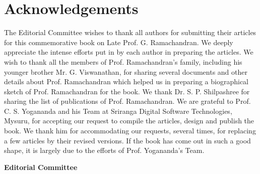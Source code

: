 \chapter*{Acknowledgements}

The Editorial Committee wishes to thank all authors for submitting their articles for this commemorative book on Late Prof. G. Ramachandran. We deeply appreciate the intense efforts put in by each author in preparing the articles. We wish to thank all the members of Prof. Ramachandran's family, including his younger brother Mr. G. Viswanathan, for sharing several documents and other details about Prof. Ramachandran which helped us in preparing a biographical sketch of Prof. Ramachandran for the book. We thank Dr. S. P. Shilpashree for sharing the list of publications of Prof. Ramachandran. We are grateful to Prof. C. S. Yogananda and his Team at Sriranga Digital Software Technologies, Mysuru, for accepting our request to compile the articles, design and publish the book. We thank him for accommodating our requests, several times, for replacing a few articles by their revised versions. If the book has come out in such a good shape, it is largely due to the efforts of Prof. Yogananda's Team.  

\bigskip

\hfill	{\bf Editorial Committee}
